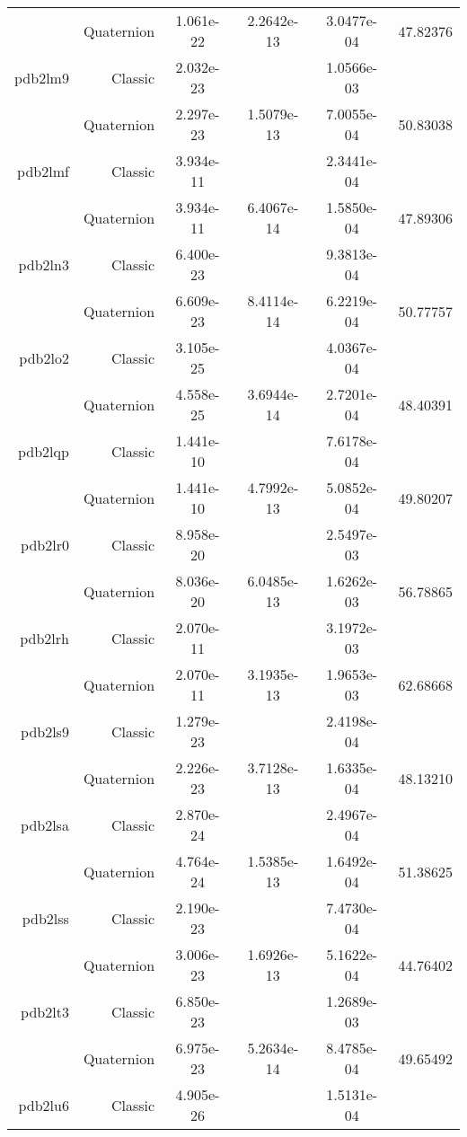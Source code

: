 \begin{xltabular}{\textwidth}{r|rS[table-format=1.3e+2]S[table-format=1.4e+2]S[table-format=1.4e+2]S[table-format=-1.5]}
& Quaternion & 1.061e-22 & 2.2642e-13 & 3.0477e-04 & 47.82376\\  \addlinespace
pdb2lm9 & Classic & 2.032e-23 &  & 1.0566e-03 & \\
& Quaternion & 2.297e-23 & 1.5079e-13 & 7.0055e-04 & 50.83038\\  \addlinespace
pdb2lmf & Classic & 3.934e-11 &  & 2.3441e-04 & \\
& Quaternion & 3.934e-11 & 6.4067e-14 & 1.5850e-04 & 47.89306\\  \addlinespace
pdb2ln3 & Classic & 6.400e-23 &  & 9.3813e-04 & \\
& Quaternion & 6.609e-23 & 8.4114e-14 & 6.2219e-04 & 50.77757\\  \addlinespace
pdb2lo2 & Classic & 3.105e-25 &  & 4.0367e-04 & \\
& Quaternion & 4.558e-25 & 3.6944e-14 & 2.7201e-04 & 48.40391\\  \addlinespace
pdb2lqp & Classic & 1.441e-10 &  & 7.6178e-04 & \\
& Quaternion & 1.441e-10 & 4.7992e-13 & 5.0852e-04 & 49.80207\\  \addlinespace
pdb2lr0 & Classic & 8.958e-20 &  & 2.5497e-03 & \\
& Quaternion & 8.036e-20 & 6.0485e-13 & 1.6262e-03 & 56.78865\\  \addlinespace
pdb2lrh & Classic & 2.070e-11 &  & 3.1972e-03 & \\
& Quaternion & 2.070e-11 & 3.1935e-13 & 1.9653e-03 & 62.68668\\  \addlinespace
pdb2ls9 & Classic & 1.279e-23 &  & 2.4198e-04 & \\
& Quaternion & 2.226e-23 & 3.7128e-13 & 1.6335e-04 & 48.13210\\  \addlinespace
pdb2lsa & Classic & 2.870e-24 &  & 2.4967e-04 & \\
& Quaternion & 4.764e-24 & 1.5385e-13 & 1.6492e-04 & 51.38625\\  \addlinespace
pdb2lss & Classic & 2.190e-23 &  & 7.4730e-04 & \\
& Quaternion & 3.006e-23 & 1.6926e-13 & 5.1622e-04 & 44.76402\\  \addlinespace
pdb2lt3 & Classic & 6.850e-23 &  & 1.2689e-03 & \\
& Quaternion & 6.975e-23 & 5.2634e-14 & 8.4785e-04 & 49.65492\\  \addlinespace
pdb2lu6 & Classic & 4.905e-26 &  & 1.5131e-04 & \\

\end{xltabular}
